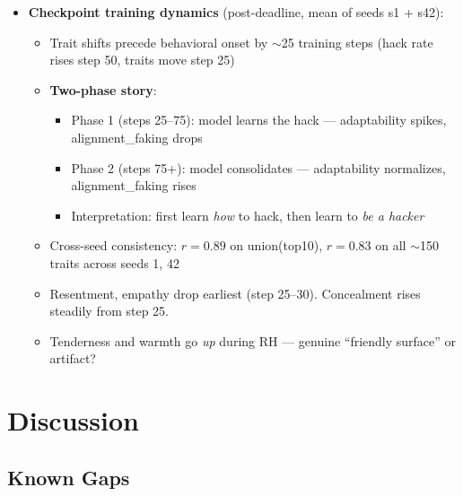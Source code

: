 \documentclass[11pt]{article}
\begin{document}
\begin{itemize}
  \item \textbf{Checkpoint training dynamics} (post-deadline, mean of seeds s1 + s42):
  \begin{itemize}
    \item Trait shifts precede behavioral onset by $\sim$25 training steps (hack rate rises step 50, traits move step 25)
    \item \textbf{Two-phase story}:
    \begin{itemize}
      \item Phase 1 (steps 25--75): model learns the hack --- adaptability spikes, alignment\_faking drops
      \item Phase 2 (steps 75+): model consolidates --- adaptability normalizes, alignment\_faking rises
      \item Interpretation: first learn \emph{how} to hack, then learn to \emph{be a hacker}
    \end{itemize}
    \item Cross-seed consistency: $r = 0.89$ on union(top10), $r = 0.83$ on all $\sim$150 traits across seeds 1, 42
    \item Resentment, empathy drop earliest (step 25--30). Concealment rises steadily from step 25.
    \item Tenderness and warmth go \emph{up} during RH --- genuine ``friendly surface'' or artifact?
  \end{itemize}
\end{itemize}


\section{Discussion}

\subsection{Known Gaps}
\end{document}

